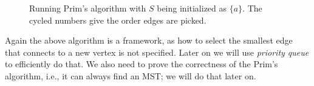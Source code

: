 \begin{minipage}{0.8\textwidth}
	\xxx
	\xxx
	\xxx
	\xxx
	\xxx
	\xxx
	\xxx
	\xxx
	\xxx
\end{minipage}

\begin{figure}[h]
\centering{}
\caption{Running Prim's algorithm with $S$ being initialized as $\{a\}$. The cycled numbers give the order edges are picked.}
\label{fig:mst2}
\end{figure}


Again the above algorithm is a framework, as how to select the
smallest edge that connects to a new vertex is not specified. 
Later on we will use \emph{priority queue} to efficiently do that.
We also need to prove the correctness of the Prim's algorithm, i.e., it can always find
an MST; we will do that later on.



